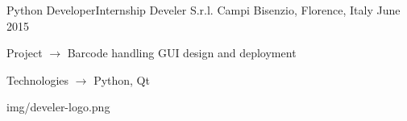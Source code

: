 \begin{cventries}
  \logocventry
    {Python Developer{\enskip\cdotp\enskip}Internship}
    {Develer S.r.l.}
    {Campi Bisenzio, Florence, Italy}
    {June 2015}
    {
      \begin{cvitems}
        \item {Project $\rightarrow$ Barcode handling GUI design and deployment}
        \item {Technologies $\rightarrow$ Python, Qt}
      \end{cvitems}
    }
    {img/develer-logo.png}

\end{cventries}
